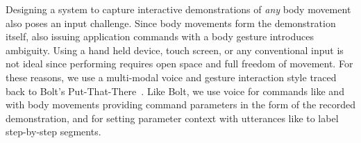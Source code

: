 Designing a system to capture interactive demonstrations of \textit{any} body movement also poses an input challenge.
Since  body movements form the demonstration itself, also issuing application commands with a body gesture introduces ambiguity.
Using a hand held device, touch screen, or any conventional input is not ideal since performing requires open space and full freedom of movement.
For these reasons, we use a multi-modal voice and gesture interaction style traced back to Bolt's Put-That-There~\cite{Bolt:1980:PutThatThere}. Like Bolt, we use voice for commands like  and  with body movements providing command parameters in the form of the recorded demonstration, and for setting parameter context with utterances like  to label step-by-step segments.






